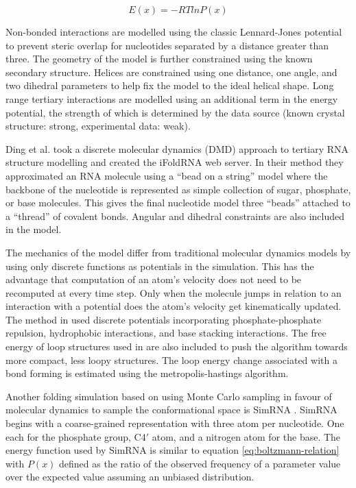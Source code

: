 \documentclass[journal]{IEEEtran}
\begin{document}
\begin{equation}
\label{eq:boltzmann-relation}
	E(x) = -RT ln P(x)
\end{equation}

Non-bonded interactions are modelled using the classic Lennard-Jones potential to prevent steric overlap for nucleotides separated by a distance greater than three. The geometry of the model is further constrained using the known secondary structure. Helices are constrained using one distance, one angle, and two dihedral parameters to help fix the model to the ideal helical shape. Long range tertiary interactions are modelled using an additional term in the energy potential, the strength of which is determined by the data source (known crystal structure: strong, experimental data: weak).

Ding et al. \cite{ding2008ab} took a discrete molecular dynamics (DMD) approach to tertiary RNA structure modelling and created the iFoldRNA web server. In their method they approximated an RNA molecule using a ``bead on a string'' model where the backbone of the nucleotide is represented as simple collection of sugar, phosphate, or base molecules. This gives the final nucleotide model three ``beads'' attached to a ``thread'' of covalent bonds. Angular and dihedral constraints are also included in the model.

The mechanics of the model differ from traditional molecular dynamics models by using only discrete functions as potentials in the simulation. This has the advantage that computation of an atom's velocity does not need to be recomputed at every time step. Only when the molecule jumps in relation to an interaction with a potential does the atom's velocity get kinematically updated. The method in \cite{ding2008ab} used discrete potentials incorporating phosphate-phosphate repulsion, hydrophobic interactions, and base stacking interactions. The free energy of loop structures used in \cite{mathews1999expanded} are also included to push the algorithm towards more compact, less loopy structures. The loop energy change associated with a bond forming is estimated using the metropolis-hastings algorithm.

Another folding simulation based on using Monte Carlo sampling in favour of molecular dynamics to sample the conformational space is SimRNA \cite{rother2012template}. SimRNA begins with a coarse-grained representation with three atom per nucleotide. One each for the phosphate group, C4$'$ atom, and a nitrogen atom for the base. The energy function used by SimRNA is similar to equation \ref{eq:boltzmann-relation} with $P(x)$ defined as the ratio of the observed frequency of a parameter value over the expected value assuming an unbiased distribution. 
\end{document}
